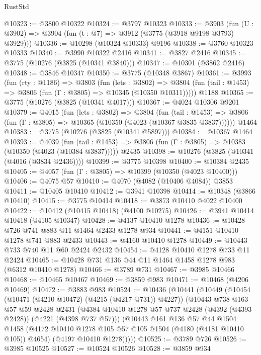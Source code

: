 \begin{lexlean}{RustStd}
\begin{coremodule}
{\begin{coremodule}
{{{{{{{{{{{{{{{{{{{{{{{{{{{{{{{@10323 := @3800 @10322
@10324 := @3797 @10323
@10333 := @3903 (fun (U : @3902) => @3904 (fun (t : @7) => @3912 (@3775 (@3918 @9198 @3793) @3929)))
@10336 := @10298 (@10324 @10333) @9196
@10338 := @3760 @10323 @10333
@10340 := @3990 @10322 @2416
@10341 := @3827 @2416
@10345 := @3775 (@10276 (@3825 (@10341 @3840)))
@10347 := @10301 (@3862 @2416)
@10348 := @3846 @10347
@10350 := @3775 (@10348 @3867)
@10361 := @3993
    (fun (rty : @1186) =>
    @3803
      (fun (lets : @3802) =>
      @3804 (fun (tail : @1453) => @3806 (fun (Γ : @3805) => @10345 (@10350 @10311)))))
    @1188
@10365 := @3775 (@10276 (@3825 (@10341 @4017)))
@10367 := @4024 @10306 @9201
@10379 := @4015
    (fun (lets : @3802) =>
    @3804
      (fun (tail : @1453) =>
      @3806 (fun (Γ : @3805) => @10365 (@10350 (@4023 (@10367 @3835 @3837))))))
    @1464
@10383 := @3775 (@10276 (@3825 (@10341 @5897)))
@10384 := @10367 @1464
@10393 := @4039
    (fun (tail : @1453) => @3806 (fun (Γ : @3805) => @10383 (@10350 (@4023 (@10384 @3837)))))
    @2435
@10398 := @10276 (@3825 (@10341 (@4016 (@3834 @2436))))
@10399 := @3775 @10398
@10400 := @10384 @2435
@10405 := @4057 (fun (Γ : @3805) => @10399 (@10350 (@4023 @10400)))
@10406 := @4075 @57
@10410 := @4070 (@4082 (@10406 @4084)) @3853
@10411 := @10405 @10410
@10412 := @3941 @10398
@10414 := @10348 (@3866 @10410)
@10415 := @3775 @10414
@10418 := @3873 @10410 @4022 @10400
@10422 := @10412 (@10415 @10418) (@4100 @10275)
@10426 := @3941 @10414 @10418 (@4105 @10347)
@10428 := @4137 @10410 @1278
@10436 := @10428 @726 @741 @883 @11 @1464 @2433 @1278 @934
@10441 := @4151 @10410 @1278 @741 @883 @2433
@10443 := @4160 @10410 @1278
@10449 := @10443 @733 @740 @11 @60 @2424 @2432
@10454 := @4128 @10410 @1278 @733 @11 @2424
@10465 := @10428 @731 @136 @44 @11 @1464 @1458 @1278 @983 (@6312 @10410 @1278)
@10466 := @3789 @731
@10467 := @3985 @10466
@10468 := @10465 @10467
@10469 := @3859 @983
@10471 := @10468 (@4206 @10469)
@10472 := @3883 @983
@10524 := @10436
    (@10441
      (@10449
        (@10454 (@10471 (@4210 @10472) (@4215 (@4217 @731)) @4227))
        (@10443
          @738
          @163
          @57
          @59
          @2428
          @2431
          (@4384 @10410 @1278 @57 @737 @2428 (@4392 (@4393 @2428)) (@4221 (@4398 @737 @57)))
          (@10443
            @161
            @136
            @57
            @44
            @1504
            @1458
            (@4172 @10410 @1278 @105 @57 @105 @1504 (@4180 (@4181 @10410 @105)) @4654)
            (@4197 @10410 @1278)))))
@10525 := @3789 @726
@10526 := @3985 @10525
@10527 := @10524 @10526
@10528 := @3859 @934
}}}}}}}}}}}}}}}}}}}}}}}}}}}}}}}
\end{coremodule}}
\end{coremodule}
\end{lexlean}

